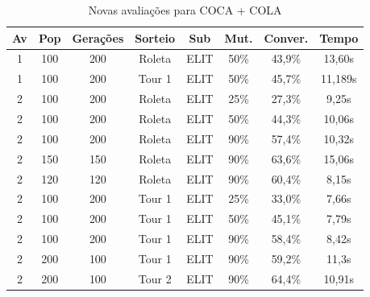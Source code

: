 \documentclass[a4paper, 12pt]{article}
\begin{document}
  \begin{table}[h]
    \centering
    \begin{tabular}{|c|c|c|c|c|c|c|c|}
      \hline
      Av & Pop & Gerações & Sorteio & Sub & Mut. & Conver. & Tempo  \\
      \hline
      1 & 100 & 200 & Roleta & ELIT & 50\% &43,9\% & 13,60s\\
      \hline
      1& 100 & 200 & Tour 1 & ELIT & 50\% &45,7\% & 11,189s\\
      \hline
      2& 100 & 200 & Roleta & ELIT & 25\% &27,3\% & 9,25s\\
      \hline
      2& 100 & 200 & Roleta & ELIT & 50\% &44,3\% & 10,06s\\
      \hline
      2& 100 & 200 & Roleta & ELIT & 90\% &57,4\% & 10,32s\\
      \hline
      2& 150 & 150 & Roleta & ELIT & 90\% &63,6\% & 15,06s\\
      \hline
      2& 120 & 120 & Roleta & ELIT & 90\% &60,4\% & 8,15s\\
      \hline
      2& 100 & 200 & Tour 1 & ELIT & 25\% &33,0\% & 7,66s\\
      \hline
      2& 100 & 200 & Tour 1 & ELIT & 50\% &45,1\% & 7,79s\\
      \hline
      2& 100 & 200 & Tour 1 & ELIT & 90\% &58,4\% & 8,42s\\
      \hline
      2& 200 & 100 & Tour 1 & ELIT & 90\% &59,2\% & 11,3s\\
      \hline
      2& 200 & 100 & Tour 2 & ELIT & 90\% &64,4\% & 10,91s\\
      \hline
    \end{tabular}
    \caption{Novas avaliações para COCA + COLA}
    \label{tab:coca}
  \end{table}
\end{document}
